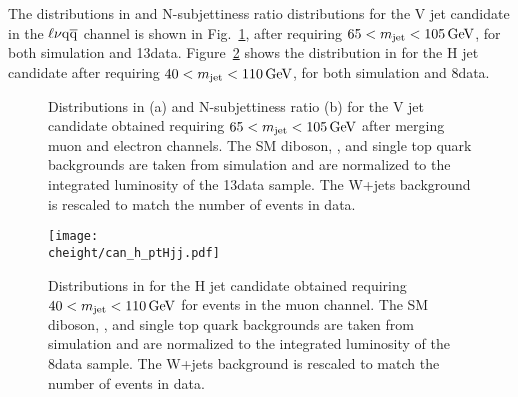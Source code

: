 The distributions in \pt and N-subjettiness ratio \nsubj distributions for the V jet candidate in the $\ell\nu\mathrm{q}\overline{\mathrm{q}}$ channel is shown in Fig.~\ref{fig:controlPlots13TeV},
after requiring $65 < m_{\text{jet}} < 105\,\text{Ge\hspace{-.08em}V}$, for both simulation and 13\TeV data.  Figure~\ref{fig:controlPlots8TeV} shows the distribution in \pt for the H jet candidate
after requiring $40 < m_{\text{jet}} < 110\,\text{Ge\hspace{-.08em}V}$, for both simulation and 8\TeV data.

\begin{figure}[!htb]
\centering
{}
\caption{Distributions in \pt (a) and N-subjettiness ratio \nsubj (b) for the V jet candidate obtained requiring $65 < m_{\text{jet}} < 105\,\text{Ge\hspace{-.08em}V}$ after merging muon and electron channels. The SM diboson, \ttbar, and single top quark backgrounds are taken from simulation and are normalized to the integrated luminosity of the 13\TeV data sample. The W+jets background is rescaled to match the number of events in data.}
\label{fig:controlPlots13TeV}
\end{figure}

\begin{figure}[!htb]
\centering
\texttt{[image: \\cheight/can\_h\_ptHjj.pdf]}
\caption{Distributions in \pt for the H jet candidate obtained requiring $40 < m_{\text{jet}} < 110\,\text{Ge\hspace{-.08em}V}$ for events in the muon channel. The SM diboson, \ttbar, and single top quark backgrounds are taken from simulation and are normalized to the integrated luminosity of the 8\TeV data sample. The W+jets background is rescaled to match the number of events in data.}
\label{fig:controlPlots8TeV}
\end{figure}
